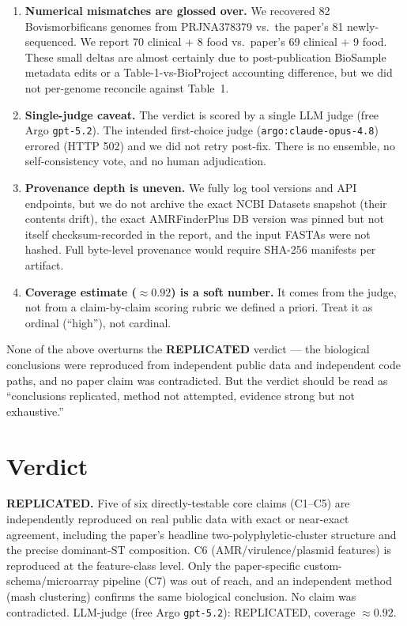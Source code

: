 \documentclass[11pt]{article}
\begin{document}
\begin{enumerate}
\item \textbf{Numerical mismatches are glossed over.} We recovered 82 Bovismorbificans genomes from PRJNA378379 vs.\ the paper's 81 newly-sequenced. We report 70 clinical + 8 food vs.\ paper's 69 clinical + 9 food. These small deltas are almost certainly due to post-publication BioSample metadata edits or a Table-1-vs-BioProject accounting difference, but we did not per-genome reconcile against Table~1.

\item \textbf{Single-judge caveat.} The verdict is scored by a single LLM judge (free Argo \texttt{gpt-5.2}). The intended first-choice judge (\texttt{argo:claude-opus-4.8}) errored (HTTP 502) and we did not retry post-fix. There is no ensemble, no self-consistency vote, and no human adjudication.

\item \textbf{Provenance depth is uneven.} We fully log tool versions and API endpoints, but we do not archive the exact NCBI Datasets snapshot (their contents drift), the exact AMRFinderPlus DB version was pinned but not itself checksum-recorded in the report, and the input FASTAs were not hashed. Full byte-level provenance would require SHA-256 manifests per artifact.

\item \textbf{Coverage estimate ($\approx 0.92$) is a soft number.} It comes from the judge, not from a claim-by-claim scoring rubric we defined a priori. Treat it as ordinal (``high''), not cardinal.
\end{enumerate}

None of the above overturns the \textbf{REPLICATED} verdict --- the biological conclusions were reproduced from independent public data and independent code paths, and no paper claim was contradicted. But the verdict should be read as ``conclusions replicated, method not attempted, evidence strong but not exhaustive.''

\section{Verdict}
\textbf{REPLICATED.} Five of six directly-testable core claims (C1--C5) are independently reproduced on real public data with exact or near-exact agreement, including the paper's headline two-polyphyletic-cluster structure and the precise dominant-ST composition. C6 (AMR/virulence/plasmid features) is reproduced at the feature-class level. Only the paper-specific custom-schema/microarray pipeline (C7) was out of reach, and an independent method (mash clustering) confirms the same biological conclusion. No claim was contradicted. LLM-judge (free Argo \texttt{gpt-5.2}): REPLICATED, coverage $\approx 0.92$.
\end{document}
